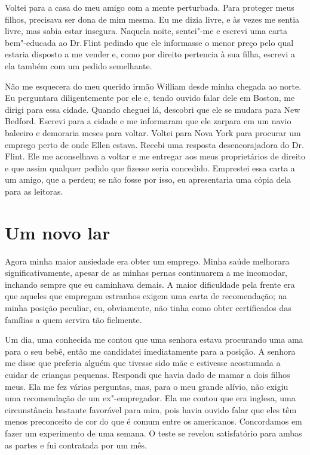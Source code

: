 Voltei para a casa do meu amigo com a
mente perturbada. Para proteger meus filhos, precisava ser dona de mim
mesma. Eu me dizia livre, e às vezes me sentia livre, mas sabia estar
insegura. Naquela noite, sentei"-me e escrevi uma carta bem"-educada ao
Dr.\,Flint pedindo que ele informasse o menor preço pelo qual estaria
disposto a me vender e, como por direito pertencia à sua filha, escrevi
a ela também com um pedido semelhante.

Não me esquecera do meu querido irmão William desde minha chegada ao
norte. Eu perguntara diligentemente por ele e, tendo ouvido falar dele
em Boston, me dirigi para essa cidade. Quando cheguei lá, descobri que
ele se mudara para New Bedford. Escrevi para a cidade e me informaram
que ele zarpara em um navio baleeiro e demoraria meses para voltar.
Voltei para Nova York para procurar um emprego perto de onde Ellen
estava. Recebi uma resposta desencorajadora do Dr.\,Flint. Ele me
aconselhava a voltar e me entregar aos meus proprietários de direito e
que assim qualquer pedido que fizesse seria concedido. Emprestei essa
carta a um amigo, que a perdeu; se não fosse por isso, eu apresentaria
uma cópia dela para as leitoras.

\chapter*{Um novo lar}

Agora minha maior ansiedade era obter
um emprego. Minha saúde melhorara significativamente, apesar de as
minhas pernas continuarem a me incomodar, inchando sempre que eu
caminhava demais. A maior dificuldade pela frente era que aqueles que
empregam estranhos exigem uma carta de recomendação; na minha posição
peculiar, eu, obviamente, não tinha como obter certificados das famílias
a quem servira tão fielmente.

Um dia, uma conhecida me contou que uma
senhora estava procurando uma ama para o seu bebê, então me candidatei
imediatamente para a posição. A senhora me disse que preferia alguém que
tivesse sido mãe e estivesse acostumada a cuidar de crianças pequenas.
Respondi que havia dado de mamar a dois filhos meus. Ela me fez várias
perguntas, mas, para o meu grande alívio, não exigiu uma recomendação de
um ex"-empregador. Ela me contou que era inglesa, uma circunstância
bastante favorável para mim, pois havia ouvido falar que eles têm menos
preconceito de cor do que é comum entre os americanos. Concordamos em
fazer um experimento de uma semana. O teste se revelou satisfatório para
ambas as partes e fui contratada por um mês.

